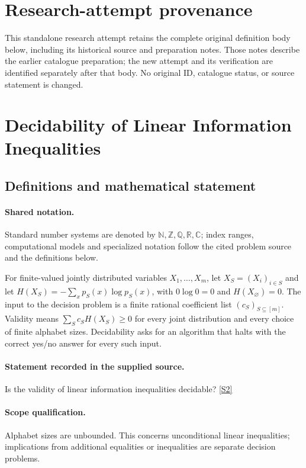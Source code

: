 \documentclass[11pt]{article}
\begin{document}
\section*{Research-attempt provenance}
This standalone research attempt retains the complete original definition body below,
including its historical source and preparation notes. Those notes describe the
earlier catalogue preparation; the new attempt and its verification are identified
separately after that body. No original ID, catalogue status, or source statement is changed.

\section{Decidability of Linear Information Inequalities}\label{statement}

\subsection{Definitions and mathematical statement}

\paragraph{Shared notation.}Standard number systems are denoted by $\mathbb N,\mathbb Z,\mathbb Q,\mathbb R,\mathbb C$; index ranges, computational models and specialized notation follow the cited problem source and the definitions below.


For finite-valued jointly distributed variables $X_1,\ldots,X_m$, let $X_S=(X_i)_{i\in S}$ and let $H(X_S)=-\sum_x p_S(x)\log p_S(x)$, with $0\log0=0$ and $H(X_\varnothing)=0$. The input to the decision problem is a finite rational coefficient list $(c_S)_{S\subseteq[m]}$. Validity means $\sum_S c_SH(X_S)\geq0$ for every joint distribution and every choice of finite alphabet sizes. Decidability asks for an algorithm that halts with the correct yes/no answer for every such input.
\paragraph{Statement recorded in the supplied source.}
Is the validity of linear information inequalities decidable? \href{https://doi.org/10.4171/owr/2022/14}{[S2]}
\paragraph{Scope qualification.}
Alphabet sizes are unbounded. This concerns unconditional linear inequalities; implications from additional equalities or inequalities are separate decision problems.
\end{document}
